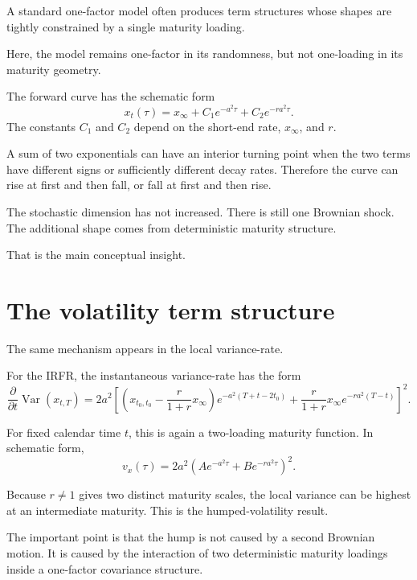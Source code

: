 \documentclass[11pt]{article}
\theoremstyle{plainbreak}
\begin{document}
A standard one-factor model often produces term structures whose shapes are tightly constrained by a single maturity loading.

Here, the model remains one-factor in its randomness, but not one-loading in its maturity geometry.

The forward curve has the schematic form
\[
x_t(\tau)=x_\infty+C_1 e^{-a^2\tau}+C_2 e^{-ra^2\tau}.
\]
The constants \(C_1\) and \(C_2\) depend on the short-end rate, \(x_\infty\), and \(r\).

A sum of two exponentials can have an interior turning point when the two terms have different signs or sufficiently different decay rates. Therefore the curve can rise at first and then fall, or fall at first and then rise.

The stochastic dimension has not increased. There is still one Brownian shock. The additional shape comes from deterministic maturity structure.

That is the main conceptual insight.

\section{The volatility term structure}

The same mechanism appears in the local variance-rate.

For the IRFR, the instantaneous variance-rate has the form
\[
\frac{\partial}{\partial t}\operatorname{Var}(x_{t,T})
=
2a^2
\left[
\left(
x_{t_0,t_0}
-
\frac{r}{1+r}x_\infty
\right)
e^{-a^2(T+t-2t_0)}
+
\frac{r}{1+r}x_\infty e^{-ra^2(T-t)}
\right]^2.
\]

For fixed calendar time \(t\), this is again a two-loading maturity function. In schematic form,
\[
v_x(\tau)
=
2a^2\left(Ae^{-a^2\tau}+Be^{-ra^2\tau}\right)^2.
\]

Because \(r\neq 1\) gives two distinct maturity scales, the local variance can be highest at an intermediate maturity. This is the humped-volatility result.

The important point is that the hump is not caused by a second Brownian motion. It is caused by the interaction of two deterministic maturity loadings inside a one-factor covariance structure.
\end{document}
